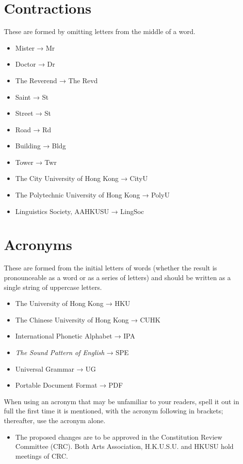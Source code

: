 \documentclass[11pt,a4paper]{book}
\newcommand{\cmark}{{\color{green(html/cssgreen)}\checkmark}}%
\begin{document}
	\section{Contractions}
	These are formed by omitting letters from the middle of a word.
		{\firasans \begin{mdframed}[backgroundcolor=aliceblue] \begin{itemize}[label=\cmark]
			\item Mister → Mr
			\item Doctor → Dr
			\item The Reverend → The Revd
			\item Saint → St
			\item Street → St
			\item Road → Rd
			\item Building → Bldg
			\item Tower → Twr
			\item The City University of Hong Kong → CityU
			\item The Polytechnic University of Hong Kong → PolyU
			\item Linguistics Society, AAHKUSU → LingSoc	
		\end{itemize} \end{mdframed} }
	\section{Acronyms}
	These are formed from the initial letters of words (whether the result is pronounceable as a word or as a series of letters) and should be written as a single string of uppercase letters.
		{\firasans \begin{mdframed}[backgroundcolor=aliceblue] \begin{itemize}[label=\cmark]
			\item The University of Hong Kong → HKU
			\item The Chinese University of Hong Kong → CUHK
			\item International Phonetic Alphabet → IPA
			\item \textit{The Sound Pattern of English} → SPE
			\item Universal Grammar → UG
			\item Portable Document Format → PDF
		\end{itemize} \end{mdframed} }
	When using an acronym that may be unfamiliar to your readers, spell it out in full the first time it is mentioned, with the acronym following in brackets; thereafter, use the acronym alone.
		{\firasans \begin{mdframed}[backgroundcolor=aliceblue] \begin{itemize}[label=\cmark]
			\item The proposed changes are to be approved in the Constitution Review Committee (CRC). Both Arts Association, H.K.U.S.U. and HKUSU hold meetings of CRC.
		\end{itemize} \end{mdframed} }
\end{document}
